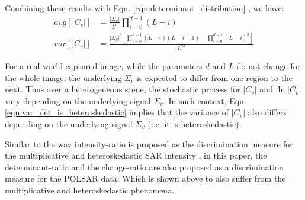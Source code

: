 \documentclass[journal]{IEEEtran}
\begin{document}
Combining these results with Eqn. \ref{eqn:determinant_distribution} %
  , we have:
{\footnotesize
\begin{align}
  avg \left[ |C_v| \right]  &= \frac{|\Sigma_v|}{L^d} \prod^{d-1}_{i=0} (L-i)\\
  var \left[ |C_v| \right]  &=   \frac{|\Sigma_v|^2 \left[ \prod^{d-1}_{i=0} (L-i)(L-i+1) - \prod^{d-1}_{i=0} (L-i)^2 \right] }{L^{2d}} \label{eqn:var_det_is_heteroskedastic}%
\end{align}
}

For a real world captured image, while the parameters $d$ and $L$ do not change for the whole image,
  the underlying $\Sigma_v$ is expected to differ from one region to the next.
Thus over a heterogeneous scene, the stochastic process for $|C_v|$ and $\ln |C_v|$ vary depending on the underlying signal $\Sigma_v$. 
In such context, Eqn. \ref{eqn:var_det_is_heteroskedastic} implies that the variance of $|C_v|$ also differs depending on the underlying signal $\Sigma_v$ (i.e. it is   heteroskedastic).

Similar to the way intensity-ratio is proposed as the discrimination measure for the multiplicative and heteroskedastic SAR intensity \cite{Rignot_1993_TGRS_896},
in this paper, the determinant-ratio and the change-ratio are also proposed as a discrimination measure for the POLSAR data:
  Which is shown above to also suffer from the multiplicative and heteroskedastic phenomena.
\end{document}
